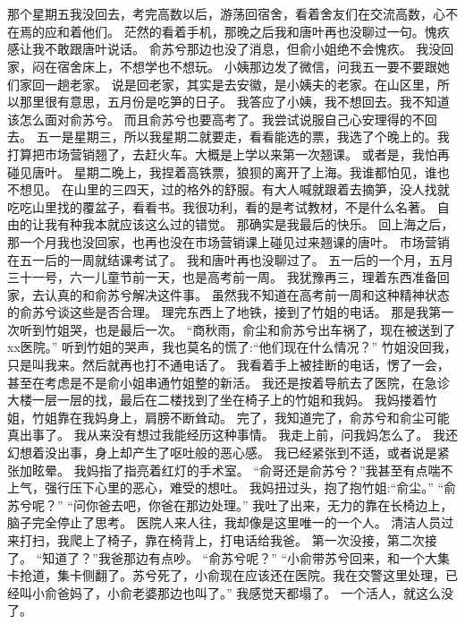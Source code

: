 \chapter{}
那个星期五我没回去，考完高数以后，游荡回宿舍，看着舍友们在交流高数，心不在焉的应和着他们。
茫然的看着手机，那晚之后我和唐叶再也没聊过一句。愧疚感让我不敢跟唐叶说话。
俞苏兮那边也没了消息，但俞小姐绝不会愧疚。
我没回家，闷在宿舍床上，不想学也不想玩。
小姨那边发了微信，问我五一要不要跟她们家回一趟老家。
说是回老家，其实是去安徽，是小姨夫的老家。在山区里，所以那里很有意思，五月份是吃笋的日子。
我答应了小姨，我不想回去。我不知道该怎么面对俞苏兮。
而且俞苏兮也要高考了。我尝试说服自己心安理得的不回去。
五一是星期三，所以我星期二就要走，看看能选的票，我选了个晚上的。我打算把市场营销翘了，去赶火车。大概是上学以来第一次翘课。
或者是，我怕再碰见唐叶。
星期二晚上，我捏着高铁票，狼狈的离开了上海。我谁都怕见，谁也不想见。
在山里的三四天，过的格外的舒服。有大人喊就跟着去摘笋，没人找就吃吃山里找的覆盆子，看看书。我很功利，看的是考试教材，不是什么名著。
自由的让我有种我本就应该这么过的错觉。
那确实是我最后的快乐。
回上海之后，那一个月我也没回家，也再也没在市场营销课上碰见过来翘课的唐叶。
市场营销在五一后的一周就结课考试了。
我和唐叶再也没聊过了。
五一后的一个月，五月三十一号，六一儿童节前一天，也是高考前一周。
我犹豫再三，理着东西准备回家，去认真的和俞苏兮解决这件事。
虽然我不知道在高考前一周和这种精神状态的俞苏兮谈这些是否合理。
理完东西上了地铁，接到了竹姐的电话。
那是我第一次听到竹姐哭，也是最后一次。
“商秋雨，俞尘和俞苏兮出车祸了，现在被送到了xx医院。”
听到竹姐的哭声，我也莫名的慌了:“他们现在什么情况？”
竹姐没回我，只是叫我来。然后就再也打不通电话了。
我看着手上被挂断的电话，愣了一会，甚至在考虑是不是俞小姐串通竹姐整的新活。
我还是按着导航去了医院，在急诊大楼一层一层的找，最后在二楼找到了坐在椅子上的竹姐和我妈。
我妈搂着竹姐，竹姐靠在我妈身上，肩膀不断耸动。
完了，我知道完了，俞苏兮和俞尘可能真出事了。
我从来没有想过我能经历这种事情。
我走上前，问我妈怎么了。
我还幻想着没出事，身上却产生了呕吐般的恶心感。
我已经紧张到不适，或者说是紧张加眩晕。
我妈指了指亮着红灯的手术室。
“俞哥还是俞苏兮？”我甚至有点喘不上气，强行压下心里的恶心，难受的想吐。
我妈扭过头，抱了抱竹姐:“俞尘。”
“俞苏兮呢？”
“问你爸去吧，你爸在那边处理。”
我吐了出来，无力的靠在长椅边上，脑子完全停止了思考。
医院人来人往，我却像是这里唯一的一个人。
清洁人员过来打扫，我爬上了椅子，靠在椅背上，打电话给我爸。
第一次没接，第二次接了。
“知道了？”我爸那边有点吵。
“俞苏兮呢？”
“小俞带苏兮回来，和一个大集卡抢道，集卡侧翻了。苏兮死了，小俞现在应该还在医院。我在交警这里处理，已经叫小俞爸妈了，小俞老婆那边也叫了。”
我感觉天都塌了。
一个活人，就这么没了。
